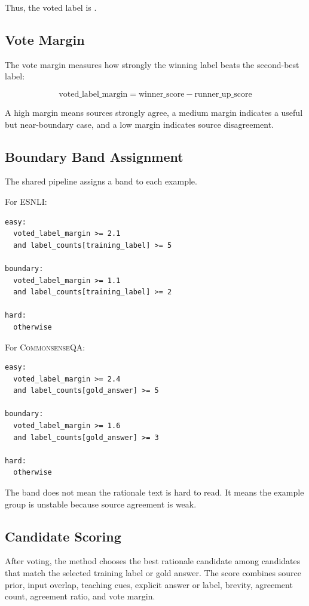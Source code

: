\documentclass[11pt]{article}
\DeclareRobustCommand{\code}[1]{\texttt{\detokenize{#1}}}
\newcommand{\dataset}[1]{\textsc{#1}}
\begin{document}
Thus, the voted label is \code{entailment}.

\subsection{Vote Margin}

The vote margin measures how strongly the winning label beats the second-best label:

\[
\mathrm{voted\_label\_margin} = \mathrm{winner\_score} - \mathrm{runner\_up\_score}
\]

A high margin means sources strongly agree, a medium margin indicates a useful but near-boundary case, and a low margin indicates source disagreement.

\subsection{Boundary Band Assignment}

The shared pipeline assigns a band to each example.

For \dataset{ESNLI}:

\begin{lstlisting}
easy:
  voted_label_margin >= 2.1
  and label_counts[training_label] >= 5

boundary:
  voted_label_margin >= 1.1
  and label_counts[training_label] >= 2

hard:
  otherwise
\end{lstlisting}

For \dataset{CommonsenseQA}:

\begin{lstlisting}
easy:
  voted_label_margin >= 2.4
  and label_counts[gold_answer] >= 5

boundary:
  voted_label_margin >= 1.6
  and label_counts[gold_answer] >= 3

hard:
  otherwise
\end{lstlisting}

The \code{hard} band does not mean the rationale text is hard to read. It means the example group is unstable because source agreement is weak.

\subsection{Candidate Scoring}

After voting, the method chooses the best rationale candidate among candidates that match the selected training label or gold answer. The score combines source prior, input overlap, teaching cues, explicit answer or label, brevity, agreement count, agreement ratio, and vote margin.
\end{document}
